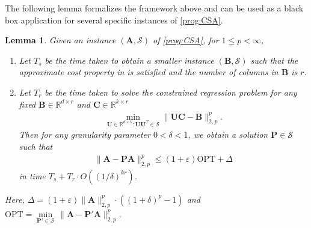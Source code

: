\documentclass[11pt]{article}
\theoremstyle{plain}
\newtheorem{lemma}[theorem]{Lemma}
\theoremstyle{plain}
\theoremstyle{definition}
\theoremstyle{plain}
\theoremstyle{remark}
\newcommand{\RR}{\mathbb{R}}
\newcommand{\cS}{\mathcal{S}}
\newcommand{\opt}{\ensuremath{\text{OPT}}\xspace}
\begin{document}
The following lemma formalizes the framework above and can be used as a black box application for several specific instances of \ref{prog:CSA}.
\begin{lemma}
\label{lem:structural-CSA}
Given an instance $(\bm{A}, \cS)$ of \ref{prog:CSA}, for $1\leq p<\infty$,
\begin{enumerate}
    \item Let $T_s$ be the time taken to obtain a smaller instance $(\bm{B}, \cS)$ such that the approximate cost property in  is satisfied and the number of columns in $\bm{B}$ is $r$.
    \item Let $T_r$ be the time taken to solve the constrained regression problem for any fixed $\bm{B}\in \RR^{d\times r}$ and $\bm{C}\in \RR^{k\times r}$
    \begin{align}
  \label{eqn:constrained_regression}      \min\limits_{\bm{U}\in \RR^{d\times k}: \bm{U}\bm{U}^T\in \cS}\|\bm{U}\bm{C}-\bm{B}\|_{2,p}^p.
    \end{align}
Then for any granularity parameter $0<\delta<1$, we obtain a solution $\bm{P}\in \cS$ such that 
\begin{align}
   \|\bm{A}-\bm{P}\bm{A}\|_{2,p}^p \leq (1+\varepsilon)\opt +\Delta
\end{align}
in time $T_s+T_r\cdot O((1/\delta)^{kr})$.
\end{enumerate}
Here, $\Delta=(1+\varepsilon)\|\bm{A}\|_{2,p}^p\cdot\left((1+\delta)^p-1\right)$ and $\opt=\min\limits_{\bm{P}' \in \cS}\, \|\bm{A}-\bm{P}'\bm{A}\|_{2,p}^p$.
\end{lemma}
\end{document}
